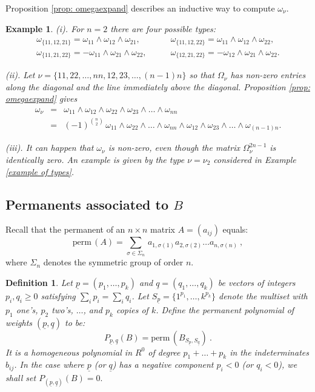 \documentclass[10pt]{amsart}
\newcommand{\pp}{{\underline{p}}}
\newcommand{\qq}{{\underline{q}}}
\newcommand{\perm}{\mathrm{perm}\,}
\theoremstyle{plain}
\newtheorem{defn}[thm]{Definition}
\newtheorem{ex}[thm]{Example}
\newcommand{\0}{\color{blue}{\mathsf{0}}}
\begin{document}
Proposition \ref{prop: omegaexpand} describes an inductive way to compute $\omega_\nu$.



\begin{ex}\label{n2ex}  
(i).   For $n=2$ there are four possible types: 
\begin{align*}
\omega_{\{11,12,21\}}=\omega_{11}\wedge\omega_{12}\wedge\omega_{21},&\qquad\omega_{\{11,12,22\}}=\omega_{11}\wedge\omega_{12}\wedge\omega_{22},\\
\omega_{\{11,21,22\}}=-\omega_{11}\wedge\omega_{21}\wedge\omega_{22},&\qquad\omega_{\{12,21,22\}}=-\omega_{12}\wedge\omega_{21}\wedge\omega_{22}.
\end{align*}

(ii).   \label{nex}
Let $\nu=\{11,22,\ldots,nn,12,23,\ldots,(n-1)n\}$ so that $\Omega_\nu$ has non-zero entries along the diagonal and the line immediately above the diagonal. Proposition \ref{prop: omegaexpand}
gives
\begin{eqnarray}\label{oWn}
\omega_{\nu} &= & \omega_{11}\wedge\omega_{12}\wedge\omega_{22}\wedge\omega_{23}\wedge\ldots\wedge\omega_{nn} \nonumber \\
 &=&(-1)^{\binom{n}2}\,\omega_{11}\wedge \omega_{22} \wedge \ldots\wedge\omega_{nn}\wedge\omega_{12} \wedge \omega_{23} \wedge\ldots
\wedge\omega_{(n-1)n}.
\end{eqnarray}

(iii). It can happen that $\omega_{\nu}$ is non-zero, even though the matrix $\Omega_{\nu}^{2n-1}$ is identically zero. 
An example is given by the type $\nu=\nu_2$ considered in Example \ref{example of types}. 
\end{ex}

\subsection{Permanents associated to \texorpdfstring{$B$}{B}}
Recall that the permanent of  an $n\times n$ matrix $A = (a_{ij})$ equals:
\[ \perm(A)  =   \sum_{\sigma\in \Sigma_n}  \, a_{1 ,\sigma(1)}a_{2 ,\sigma(2)} \ldots a_{n,\sigma(n)} \ ,\]
where $\Sigma_n$ denotes the symmetric group of order $n$.

\begin{defn}
Let  $\pp=(p_1,\ldots, p_k)$ and $\qq=(q_1,\ldots, q_k)$ be vectors  of integers $p_i,q_i \geq 0$ satisfying $\sum_{i} p_i = \sum_i q_i$.  
Let $S_{\pp}=\{ 1^{p_1}, \ldots, k^{p_k}\}$ denote the multiset  with $p_1$ one's, $p_2$ two's, $\ldots$, and $p_k$ copies of $k$. 
Define the \emph{permanent polynomial} of weights $(\pp,\qq)$ to be:  
\begin{equation}\label{Pdef}
P_{\pp, \qq}(B)=\perm  (B_{S_\pp,S_\qq}) \ . 
\end{equation}  
It is a homogeneous polynomial  in $R^0$ of degree $p_1+\ldots+p_k$ in the indeterminates  $b_{ij}$. In the case where $\pp$ (or $\qq$) has a negative component $p_i<0$ (or $q_i<0$), we shall set $P_{(\pp,\qq)}(B)=0.$
\end{defn}
\end{document}
